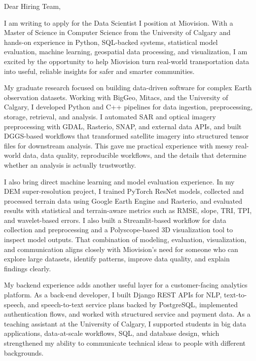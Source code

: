 \documentclass[11pt]{letter}
\begin{document}
\begin{letter}{}

\opening{Dear Hiring Team,}

I am writing to apply for the Data Scientist I position at Miovision. With a Master of Science in Computer Science from the University of Calgary and hands-on experience in Python, SQL-backed systems, statistical model evaluation, machine learning, geospatial data processing, and visualization, I am excited by the opportunity to help Miovision turn real-world transportation data into useful, reliable insights for safer and smarter communities.

My graduate research focused on building data-driven software for complex Earth observation datasets. Working with BigGeo, Mitacs, and the University of Calgary, I developed Python and C++ pipelines for data ingestion, preprocessing, storage, retrieval, and analysis. I automated SAR and optical imagery preprocessing with GDAL, Rasterio, SNAP, and external data APIs, and built DGGS-based workflows that transformed satellite imagery into structured tensor files for downstream analysis. This gave me practical experience with messy real-world data, data quality, reproducible workflows, and the details that determine whether an analysis is actually trustworthy.

I also bring direct machine learning and model evaluation experience. In my DEM super-resolution project, I trained PyTorch ResNet models, collected and processed terrain data using Google Earth Engine and Rasterio, and evaluated results with statistical and terrain-aware metrics such as RMSE, slope, TRI, TPI, and wavelet-based errors. I also built a Streamlit-based workflow for data collection and preprocessing and a Polyscope-based 3D visualization tool to inspect model outputs. That combination of modeling, evaluation, visualization, and communication aligns closely with Miovision's need for someone who can explore large datasets, identify patterns, improve data quality, and explain findings clearly.

My backend experience adds another useful layer for a customer-facing analytics platform. As a back-end developer, I built Django REST APIs for NLP, text-to-speech, and speech-to-text service plans backed by PostgreSQL, implemented authentication flows, and worked with structured service and payment data. As a teaching assistant at the University of Calgary, I supported students in big data applications, data-at-scale workflows, SQL, and database design, which strengthened my ability to communicate technical ideas to people with different backgrounds.


\end{letter}
\end{document}
